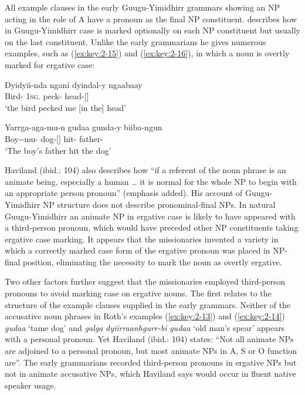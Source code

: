 All example clauses in the early Guugu-Yimidhirr grammars showing an NP acting in the role of A have a pronoun as the final NP constituent. 
\citet[102--5]{haviland_guugu_1979} describes how in Guugu-Yimidhirr case is marked optionally on each NP constituent but usually on the last constituent. Unlike the early grammarians he gives numerous examples, such as (\ref{ex:key:2-15}) and (\ref{ex:key:2-16}), in which a noun is overtly marked for ergative case: 

\ea\label{ex:key:2-15}
\gll Dyidyii-nda ngani dyindal-y ngaabaay\\
Bird- 1\textsc{sg}. peck- head-[]\\
\glt `the bird pecked me [in the] head' \\
\citep[58]{haviland_guugu_1979}
\z

\ea\label{ex:key:2-16}
\gll Yarrga-aga-mu-n gudaa gunda-y biiba-ngun\\
Boy--mu-	dog-[] hit- father-\\
\glt `The boy’s father hit the dog' \\
\citep[57]{haviland_guugu_1979}
\z

Haviland (ibid.: 104) also describes how “if a referent of the noun phrase is an animate being, especially a human … it is normal for the whole NP to begin with an appropriate person pronoun'' (emphasis added). His account of Guugu-Yimidhirr NP structure does not describe pronominal-final NPs. In natural Guugu-Yimidhirr an animate NP in ergative case is likely to have appeared with a third-person pronoun, which would have preceded other NP constituents taking ergative case marking. It appears that the missionaries invented a variety in which a correctly marked case form of the ergative pronoun was placed in NP-final position, eliminating the necessity to mark the noun as overtly ergative.

Two other factors further suggest that the missionaries employed third-person pronouns to avoid marking case on ergative nouns. The first relates to the structure of the example clauses supplied in the early grammars. Neither of the accusative noun phrases in Roth’s examples (\ref{ex:key:2-13}) and (\ref{ex:key:2-14}) \textit{gudaa} `tame dog' and \textit{galga} \textit{dyiirraanhgurr-bi} \textit{gudaa} `old man’s spear' appears with a personal pronoun. Yet Haviland (ibid.: 104) states: “Not all animate NPs are adjoined to a personal pronoun, but most animate NPs in A, S or O function are”. The early grammarians recorded third-person pronouns in ergative NPs but not in animate accusative NPs, which Haviland says would occur in fluent native speaker usage.

